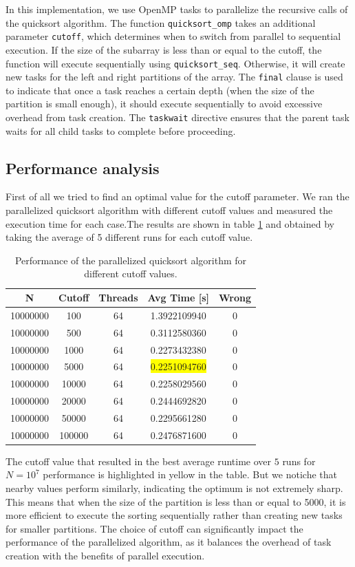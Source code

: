 \documentclass[unicode,10pt,a4paper,oneside,numbers=endperiod,openany]{scrartcl}
\begin{document}
In this implementation, we use OpenMP tasks to parallelize the recursive calls of the quicksort algorithm. The function \texttt{quicksort\_omp} takes an additional parameter \texttt{cutoff}, which determines when to switch from parallel to sequential execution. If the size of the subarray is less than or equal to the cutoff, the function will execute sequentially using \texttt{quicksort\_seq}. Otherwise, it will create new tasks for the left and right partitions of the array. The \texttt{final} clause is used to indicate that once a task reaches a certain depth (when the size of the partition is small enough), it should execute sequentially to avoid excessive overhead from task creation. The \texttt{taskwait} directive ensures that the parent task waits for all child tasks to complete before proceeding.
\subsection{Performance analysis}
First of all we tried to find an optimal value for the cutoff parameter. We ran the parallelized quicksort algorithm with different cutoff values and measured the execution time for each case.The results are shown in table \ref{tab:quicksort_cutoff} and obtained by taking the average of 5 different runs for each cutoff value. 

\begin{table}[h]
\centering
\begin{tabular}{|c|c|c|c|c|}
\hline
N & Cutoff & Threads & Avg Time [s] & Wrong \\
\hline
10000000 & 100 & 64 & 1.3922109940 & 0 \\
10000000 & 500 & 64 & 0.3112580360 & 0 \\
10000000 & 1000 & 64 & 0.2273432380 & 0 \\
10000000 & 5000 & 64 & \colorbox{yellow}{0.2251094760} & 0 \\
10000000 & 10000 & 64 & 0.2258029560 & 0 \\
10000000 & 20000 & 64 & 0.2444692820 & 0 \\
10000000 & 50000 & 64 & 0.2295661280 & 0 \\
10000000 & 100000 & 64 & 0.2476871600 & 0 \\
\hline
\end{tabular}
\caption{Performance of the parallelized quicksort algorithm for different cutoff values.}
\label{tab:quicksort_cutoff}
\end{table}

The cutoff value that resulted in the best average runtime over $5$ runs for $N=10^7$ performance is highlighted in yellow in the table. But we notiche that nearby values perform similarly, indicating the optimum is not extremely sharp. This means that when the size of the partition is less than or equal to 5000, it is more efficient to execute the sorting sequentially rather than creating new tasks for smaller partitions. The choice of cutoff can significantly impact the performance of the parallelized algorithm, as it balances the overhead of task creation with the benefits of parallel execution.\\
\end{document}
